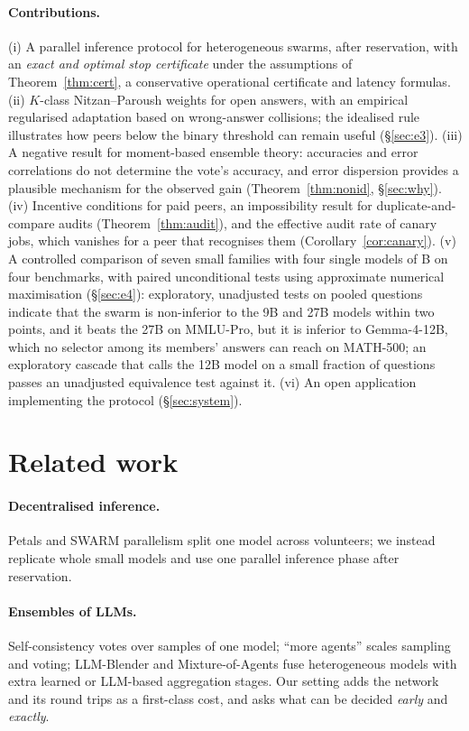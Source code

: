 \documentclass[11pt]{article}
\theoremstyle{definition}
\theoremstyle{remark}
\begin{document}
\paragraph{Contributions.}
(i) A parallel inference protocol for heterogeneous swarms, after reservation, with an
\emph{exact and optimal stop certificate} under the assumptions of Theorem~\ref{thm:cert}, a conservative
operational certificate and latency formulas. (ii) $K$-class Nitzan--Paroush weights for open answers,
with an empirical regularised adaptation based on wrong-answer collisions; the idealised rule illustrates
how peers below the binary threshold can remain useful (\S\ref{sec:e3}). (iii) A negative result for moment-based
ensemble theory: accuracies and error correlations do not determine the vote's accuracy, and error dispersion provides a
plausible mechanism for the observed gain (Theorem~\ref{thm:nonid}, \S\ref{sec:why}). (iv) Incentive conditions for
paid peers, an impossibility result for duplicate-and-compare audits (Theorem~\ref{thm:audit}), and the
effective audit rate of canary jobs, which vanishes for a peer that recognises them
(Corollary~\ref{cor:canary}). (v) A controlled comparison of seven small families with four single models of
\eFourRefSizes{}B on four benchmarks, with paired unconditional tests using approximate numerical maximisation
(\S\ref{sec:e4}): exploratory, unadjusted tests on pooled questions indicate that the swarm is non-inferior to the 9B
and 27B models within two points,
and it beats the 27B on MMLU-Pro, but it is inferior to Gemma-4-12B, which no selector among its members' answers can
reach on MATH-500; an
exploratory cascade that calls the 12B model on a small fraction of questions passes an unadjusted
equivalence test against it. (vi) An open application implementing the protocol (\S\ref{sec:system}).

\section{Related work}
\paragraph{Decentralised inference.} Petals \cite{borzunov2023petals} and SWARM parallelism
\cite{ryabinin2023swarm} split one model across volunteers; we instead replicate whole small models and
use one parallel inference phase after reservation.
\paragraph{Ensembles of LLMs.} Self-consistency \cite{wang2023selfconsistency} votes over samples of one
model; ``more agents'' \cite{li2024moreagents} scales sampling and voting; LLM-Blender
\cite{jiang2023llmblender} and Mixture-of-Agents \cite{wang2024moa} fuse heterogeneous models with extra
learned or LLM-based aggregation stages. Our setting adds the network and its round trips as a first-class
cost, and asks what can be decided \emph{early} and \emph{exactly}.
\end{document}
